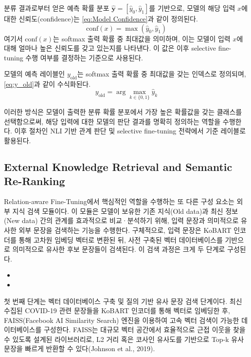 \documentclass[a4paper,fleqn]{cas-sc}
\begin{document}
분류 결과로부터 얻은 예측 확률 분포 \(\hat{\mathbf{y}} = [\hat{y}_{0}, \hat{y}_{1}]\)를 기반으로, 모델의 해당 입력 \(x\)에 대한 신뢰도(confidence)는 \cref{eq:Model Confidence}과 같이 정의된다.
\begin{equation}
    \mathrm{conf}(x) = \max \left( \hat{y}_0, \hat{y}_1 \right)
    \label{eq:Model Confidence}
\end{equation}
\noindent
여기서 \( \mathrm{conf}(x) \)는 softmax 출력 확률 중 최대값을 의미하며, 이는 모델이 입력 \( x \)에 대해 얼마나 높은 신뢰도를 갖고 있는지를 나타낸다. 
이 값은 이후 selective fine-tuning 수행 여부를 결정하는 기준으로 사용된다.

모델의 예측 레이블인 \(y_{\text{old}}\)는 softmax 출력 확률 중 최대값을 갖는 인덱스로 정의되며, \cref{eq:y_old}과 같이 수식화된다.
\begin{equation}
    y_{\text{old}} = \arg\max_{k \in \{0, 1\}} \hat{y}_k
    \label{eq:y_old}
\end{equation}

이러한 방식은 모델이 출력한 분류 확률 분포에서 가장 높은 확률값을 갖는 클래스를 선택함으로써, 해당 입력에 대한 모델의 판단 결과를 명확히 정의하는 역할을 수행한다. 이후 절차인 NLI 기반 관계 판단 및 selective fine-tuning 전략에서 기준 레이블로 활용된다.


\subsection{External Knowledge Retrieval and Semantic Re-Ranking}

Relation-aware Fine-Tuning에서 핵심적인 역할을 수행하는 또 다른 구성 요소는 외부 지식 검색 모듈이다. 이 모듈은 모델이 보유한 기존 지식(Old data)과 최신 정보(New data) 간의 관계를 효과적으로 비교·분석하기 위해, 입력 문장과 의미적으로 유사한 외부 문장을 검색하는 기능을 수행한다.
구체적으로, 입력 문장은 KoBART 인코더를 통해 고차원 임베딩 벡터로 변환된 뒤, 사전 구축된 벡터 데이터베이스를 기반으로 의미적으로 유사한 후보 문장들이 검색된다. 이 검색 과정은 크게 두 단계로 구성된다.

\begin{itemize}
    \item{}
    
    \item{}
\end{itemize} 

첫 번째 단계는 벡터 데이터베이스 구축 및 질의 기반 유사 문장 검색 단계이다. 최신 수집된 COVID-19 관련 문장들을 KoBART 인코더를 통해 벡터로 임베딩한 후, FAISS(Facebook AI Similarity Search) 엔진을 이용하여 고속 벡터 검색이 가능한 데이터베이스를 구성한다. FAISS는 대규모 벡터 공간에서 효율적으로 근접 이웃을 찾을 수 있도록 설계된 라이브러리로, L2 거리 혹은 코사인 유사도를 기반으로 Top-k 유사 문장을 빠르게 반환할 수 있다(Johnson et al., 2019).
\end{document}
